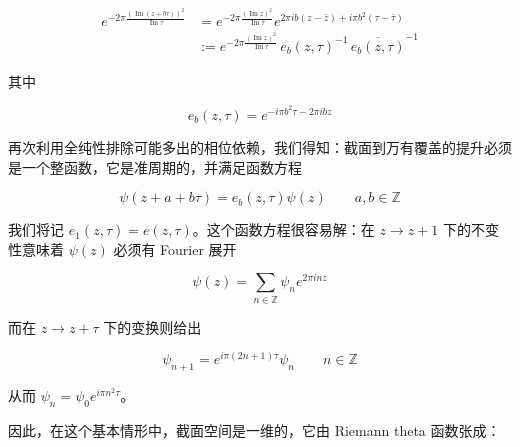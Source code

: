 \begin{equation}
  \begin{aligned}
    e^{-2\pi\frac{(\operatorname{Im}(z+b\tau))^2}{\operatorname{Im}\tau}}
    &=e^{-2\pi\frac{(\operatorname{Im}z)^2}{\operatorname{Im}\tau}}
    e^{2\pi ib(z-\bar z)+i\pi b^2(\tau-\bar\tau)}\\
    &:=e^{-2\pi\frac{(\operatorname{Im}z)^2}{\operatorname{Im}\tau}}
    \,e_b(z,\tau)^{-1}\,\overline{e_b(z,\tau)}^{-1}
  \end{aligned}
  \tag{2.165}
  \label{eq:2.165}
\end{equation}

其中

\begin{equation}
  e_b(z,\tau)=e^{-i\pi b^2\tau-2\pi ibz}
  \tag{2.166}
  \label{eq:2.166}
\end{equation}

再次利用全纯性排除可能多出的相位依赖，我们得知：截面到万有覆盖的提升必须是一个整函数，它是准周期的，并满足函数方程

\begin{equation}
  \psi(z+a+b\tau)=e_b(z,\tau)\psi(z) \qquad a,b\in\mathbb{Z}
  \tag{2.167}
  \label{eq:2.167}
\end{equation}

我们将记 $e_1(z,\tau)=e(z,\tau)$。这个函数方程很容易解：在 $z\to z+1$ 下的不变性意味着 $\psi(z)$ 必须有 Fourier 展开

\begin{equation}
  \psi(z)=\sum_{n\in\mathbb{Z}}\psi_n e^{2\pi inz}
  \tag{2.168}
  \label{eq:2.168}
\end{equation}

而在 $z\to z+\tau$ 下的变换则给出

\begin{equation}
  \psi_{n+1}=e^{i\pi(2n+1)\tau}\psi_n \qquad n\in\mathbb{Z}
  \tag{2.169}
  \label{eq:2.169}
\end{equation}

从而 $\psi_n=\psi_0e^{i\pi n^2\tau}$。

因此，在这个基本情形中，截面空间是一维的，它由 Riemann theta 函数张成：


